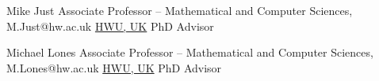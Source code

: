 

\begin{cvhonors}
  \cvhonor
    {Mike Just} %
    { Associate Professor -- Mathematical and Computer Sciences, M.Just@hw.ac.uk} %
    {\href{https://hw.ac.uk}{HWU, UK}} %
    {PhD Advisor} %



  \cvhonor
    {Michael Lones} %
    { Associate Professor -- Mathematical and Computer Sciences, M.Lones@hw.ac.uk } %
    {\href{https://hw.ac.uk}{HWU, UK}} %
    {PhD Advisor} %



\end{cvhonors}